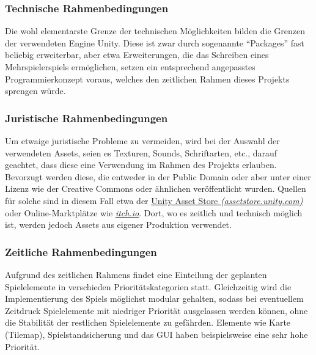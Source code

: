 \documentclass[paper=A4,pagesize=auto,12pt,headinclude=true,footinclude=true,BCOR=0mm,DIV=calc]{scrartcl}
\newcommand{\sectionspace}{
	\vspace{0.5cm}
}
\begin{document}
\subsubsection{Technische Rahmenbedingungen}
Die wohl elementarste Grenze der technischen Möglichkeiten bilden die Grenzen der verwendeten Engine Unity.  Diese ist zwar durch sogenannte "`Packages"' fast beliebig erweiterbar, aber etwa Erweiterungen, die das Schreiben eines Mehrspielerspiels ermöglichen, setzen ein entsprechend angepasstes Programmierkonzept voraus, welches den zeitlichen Rahmen dieses Projekts sprengen würde.

\subsubsection{Juristische Rahmenbedingungen}
Um etwaige juristische Probleme zu vermeiden, wird bei der Auswahl der verwendeten Assets, seien es Texturen, Sounds, Schriftarten, etc., darauf geachtet, dass diese eine Verwendung im Rahmen des Projekts erlauben. Bevorzugt werden diese, die entweder in der Public Domain oder aber unter einer Lizenz wie der Creative Commons \cite{cc_licenses} oder ähnlichen veröffentlicht wurden. Quellen für solche sind in diesem Fall etwa der \hyperref{https://assetstore.unity.com/}{}{}{Unity Asset Store \textit{(assetstore.unity.com)}} oder Online-Marktplätze wie \hyperref{https://itch.io/}{}{}{\textit{itch.io}}. Dort, wo es zeitlich und technisch möglich ist, werden jedoch Assets aus eigener Produktion verwendet.

\subsubsection{Zeitliche Rahmenbedingungen}
Aufgrund des zeitlichen Rahmens findet eine Einteilung der geplanten Spielelemente in verschieden Prioritätskategorien statt. Gleichzeitig wird die Implementierung des Spiels möglichst modular gehalten, sodass bei eventuellem Zeitdruck Spielelemente mit niedriger Priorität ausgelassen werden können, ohne die Stabilität der restlichen Spielelemente zu gefährden. Elemente wie Karte (Tilemap), Spielstandsicherung und das GUI haben beispielsweise eine sehr hohe Priorität.

\sectionspace
\end{document}
